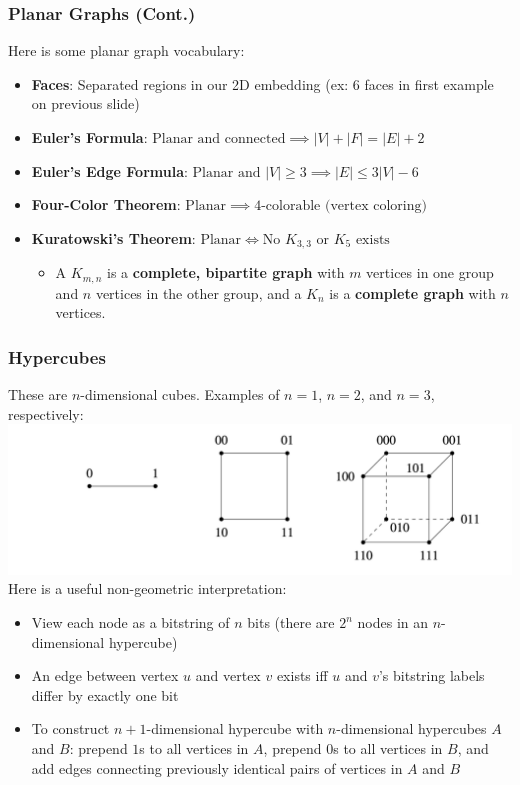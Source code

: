 \documentclass{beamer}
\begin{document}
\begin{frame}
    \frametitle{Planar Graphs (Cont.)}
    Here is some planar graph vocabulary:
    \begin{itemize}
        \item {\bf Faces}: Separated regions in our 2D embedding (ex: $6$ faces in first example on previous slide)\\
        \item {\bf Euler's Formula}: $\text{Planar and connected}\implies|V|+|F|=|E|+2$\\
        \item {\bf Euler's Edge Formula}: $\text{Planar and }|V|\geq 3\implies |E|\leq 3|V|-6$\\
        \item {\bf Four-Color Theorem}: $\text{Planar}\implies4\text{-colorable (vertex coloring)}$\\
        \item {\bf Kuratowski's Theorem}: $\text{Planar}\iff\text{No }K_{3,3}\text{ or }K_5\text{ exists}$
        \begin{itemize}
            \item A $K_{m,n}$ is a {\bf complete, bipartite graph} with $m$ vertices in one group and $n$ vertices in the other group, and a $K_n$ is a {\bf complete graph} with $n$ vertices.
        \end{itemize}
    \end{itemize}
\end{frame}

\begin{frame}
    \frametitle{Hypercubes}
    These are $n$-dimensional cubes. Examples of $n=1$, $n=2$, and $n=3$, respectively:\\
    \includegraphics[scale=0.3]{Images/hypercubes.png}\\
    Here is a useful non-geometric interpretation:
    \begin{itemize}
        \item View each node as a bitstring of $n$ bits (there are $2^n$ nodes in an $n$-dimensional hypercube)
        \item An edge between vertex $u$ and vertex $v$ exists iff $u$ and $v$'s bitstring labels differ by exactly one bit
        \item To construct $n+1$-dimensional hypercube with $n$-dimensional hypercubes $A$ and $B$: prepend $1$s to all vertices in $A$, prepend $0$s to all vertices in $B$, and add edges connecting previously identical pairs of vertices in $A$ and $B$
    \end{itemize}
\end{frame}
\end{document}
